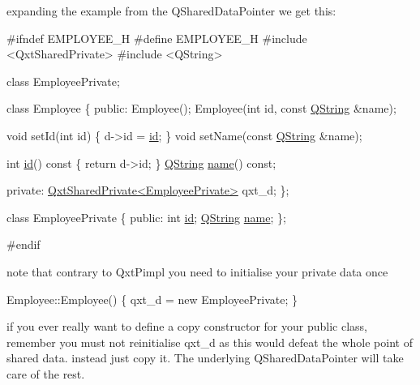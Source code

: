 expanding the example from the Q\-Shared\-Data\-Pointer we get this\-: 
\begin{DoxyCode}
\textcolor{preprocessor}{#ifndef EMPLOYEE\_H}
\textcolor{preprocessor}{}\textcolor{preprocessor}{#define EMPLOYEE\_H}
\textcolor{preprocessor}{}
\textcolor{preprocessor}{#include <QxtSharedPrivate>}
\textcolor{preprocessor}{#include <QString>}

\textcolor{keyword}{class }EmployeePrivate;

\textcolor{keyword}{class }Employee
\{
\textcolor{keyword}{public}:
    Employee();
    Employee(\textcolor{keywordtype}{int} \textcolor{keywordtype}{id}, \textcolor{keyword}{const} \hyperlink{group___u_a_v_objects_plugin_gab9d252f49c333c94a72f97ce3105a32d}{QString} &name);

    \textcolor{keywordtype}{void} setId(\textcolor{keywordtype}{int} \textcolor{keywordtype}{id}) \{ d->id = \hyperlink{glext_8h_a58c2a664503e14ffb8f21012aabff3e9}{id}; \}
    \textcolor{keywordtype}{void} setName(\textcolor{keyword}{const} \hyperlink{group___u_a_v_objects_plugin_gab9d252f49c333c94a72f97ce3105a32d}{QString} &name);

    \textcolor{keywordtype}{int} \hyperlink{glext_8h_a58c2a664503e14ffb8f21012aabff3e9}{id}()\textcolor{keyword}{ const }\{ \textcolor{keywordflow}{return} d->id; \}
    \hyperlink{group___u_a_v_objects_plugin_gab9d252f49c333c94a72f97ce3105a32d}{QString} \hyperlink{glext_8h_ad977737dfc9a274a62741b9500c49a32}{name}() \textcolor{keyword}{const};

\textcolor{keyword}{private}:
    \hyperlink{class_qxt_shared_private}{QxtSharedPrivate<EmployeePrivate>} qxt\_d;
\};


\textcolor{keyword}{class }EmployeePrivate
\{
\textcolor{keyword}{public}:
    \textcolor{keywordtype}{int} \hyperlink{glext_8h_a58c2a664503e14ffb8f21012aabff3e9}{id};
    \hyperlink{group___u_a_v_objects_plugin_gab9d252f49c333c94a72f97ce3105a32d}{QString} \hyperlink{glext_8h_ad977737dfc9a274a62741b9500c49a32}{name};
\};

\textcolor{preprocessor}{#endif}
\end{DoxyCode}


note that contrary to Qxt\-Pimpl you need to initialise your private data once


\begin{DoxyCode}
Employee::Employee()
\{
    qxt\_d = \textcolor{keyword}{new} EmployeePrivate;
\}
\end{DoxyCode}


if you ever really want to define a copy constructor for your public class, remember you must not reinitialise qxt\-\_\-d as this would defeat the whole point of shared data. instead just copy it. The underlying Q\-Shared\-Data\-Pointer will take care of the rest.


